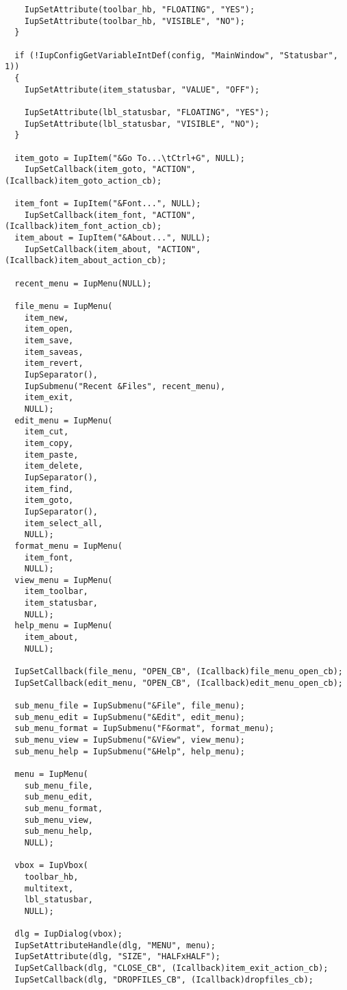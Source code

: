 \documentclass{ctexart}
\begin{document}
\begin{lstlisting}
    IupSetAttribute(toolbar_hb, "FLOATING", "YES");
    IupSetAttribute(toolbar_hb, "VISIBLE", "NO");
  }

  if (!IupConfigGetVariableIntDef(config, "MainWindow", "Statusbar", 1))
  {
    IupSetAttribute(item_statusbar, "VALUE", "OFF");

    IupSetAttribute(lbl_statusbar, "FLOATING", "YES");
    IupSetAttribute(lbl_statusbar, "VISIBLE", "NO");
  }

  item_goto = IupItem("&Go To...\tCtrl+G", NULL);
    IupSetCallback(item_goto, "ACTION", (Icallback)item_goto_action_cb);

  item_font = IupItem("&Font...", NULL);
    IupSetCallback(item_font, "ACTION", (Icallback)item_font_action_cb);
  item_about = IupItem("&About...", NULL);
    IupSetCallback(item_about, "ACTION", (Icallback)item_about_action_cb);

  recent_menu = IupMenu(NULL);

  file_menu = IupMenu(
    item_new,
    item_open,
    item_save,
    item_saveas,
    item_revert,
    IupSeparator(),
    IupSubmenu("Recent &Files", recent_menu),
    item_exit,
    NULL);
  edit_menu = IupMenu(
    item_cut,
    item_copy,
    item_paste,
    item_delete,
    IupSeparator(),
    item_find,
    item_goto,
    IupSeparator(),
    item_select_all,
    NULL);
  format_menu = IupMenu(
    item_font,
    NULL);
  view_menu = IupMenu(
    item_toolbar,
    item_statusbar,
    NULL);
  help_menu = IupMenu(
    item_about,
    NULL);

  IupSetCallback(file_menu, "OPEN_CB", (Icallback)file_menu_open_cb);
  IupSetCallback(edit_menu, "OPEN_CB", (Icallback)edit_menu_open_cb);

  sub_menu_file = IupSubmenu("&File", file_menu);
  sub_menu_edit = IupSubmenu("&Edit", edit_menu);
  sub_menu_format = IupSubmenu("F&ormat", format_menu);
  sub_menu_view = IupSubmenu("&View", view_menu);
  sub_menu_help = IupSubmenu("&Help", help_menu);

  menu = IupMenu(
    sub_menu_file,
    sub_menu_edit,
    sub_menu_format,
    sub_menu_view,
    sub_menu_help,
    NULL);

  vbox = IupVbox(
    toolbar_hb,
    multitext,
    lbl_statusbar,
    NULL);

  dlg = IupDialog(vbox);
  IupSetAttributeHandle(dlg, "MENU", menu);
  IupSetAttribute(dlg, "SIZE", "HALFxHALF");
  IupSetCallback(dlg, "CLOSE_CB", (Icallback)item_exit_action_cb);
  IupSetCallback(dlg, "DROPFILES_CB", (Icallback)dropfiles_cb);


\end{lstlisting}
\end{document}
